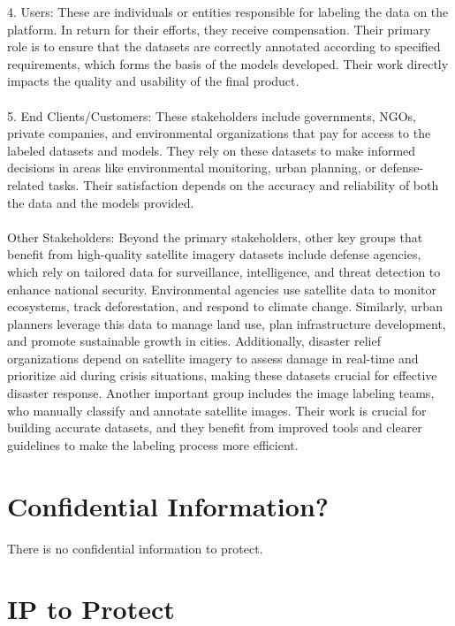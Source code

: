 \documentclass{article}
\begin{document}
4.	Users: These are individuals or entities responsible for labeling the data on the platform. In return for their efforts, they receive compensation. Their primary role is to ensure that the datasets are correctly annotated according to specified requirements, which forms the basis of the models developed. Their work directly impacts the quality and usability of the final product. \\
\\

5.	End Clients/Customers: These stakeholders include governments, NGOs, private companies, and environmental organizations that pay for access to the labeled datasets and models. They rely on these datasets to make informed decisions in areas like environmental monitoring, urban planning, or defense-related tasks. Their satisfaction depends on the accuracy and reliability of both the data and the models provided. \\
\\


Other Stakeholders: Beyond the primary stakeholders, other key groups that benefit from high-quality satellite imagery datasets include defense agencies, which rely on tailored data for surveillance, intelligence, and threat detection to enhance national security. Environmental agencies use satellite data to monitor ecosystems, track deforestation, and respond to climate change. Similarly, urban planners leverage this data to manage land use, plan infrastructure development, and promote sustainable growth in cities. Additionally, disaster relief organizations depend on satellite imagery to assess damage in real-time and prioritize aid during crisis situations, making these datasets crucial for effective disaster response. Another important group includes the image labeling teams, who manually classify and annotate satellite images. Their work is crucial for building accurate datasets, and they benefit from improved tools and clearer guidelines to make the labeling process more efficient.




\section{Confidential Information?} 

There is no confidential information to protect.

\section{IP to Protect}
\end{document}
